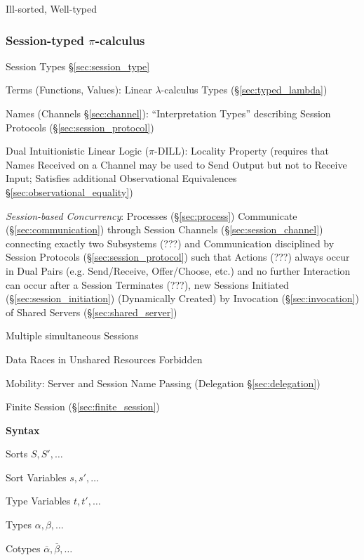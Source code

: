 Ill-sorted, Well-typed %



\subsubsection{Session-typed $\pi$-calculus}
\label{sec:session_typed_pi_calculus}
\cite{honda-vasconcelos-kubo98}
\cite{caires-pfenning10}

Session Types \S\ref{sec:session_type}

Terms (Functions, Values): Linear $\lambda$-calculus Types
(\S\ref{sec:typed_lambda})

Names (Channels \S\ref{sec:channel}): ``Interpretation Types''
describing Session Protocols (\S\ref{sec:session_protocol})

Dual Intuitionistic Linear Logic ($\pi$-DILL):
\cite{caires-pfenning10} Locality Property (requires that Names
Received on a Channel may be used to Send Output but not to Receive
Input; Satisfies additional Observational Equivalences
\S\ref{sec:observational_equality}) \cite{wadler12}

\emph{Session-based Concurrency}: Processes (\S\ref{sec:process})
Communicate (\S\ref{sec:communication}) through Session Channels
(\S\ref{sec:session_channel}) connecting exactly two Subsystems (???)
and Communication disciplined by Session Protocols
(\S\ref{sec:session_protocol}) such that Actions (???) always occur in
Dual Pairs (e.g. Send/Receive, Offer/Choose, etc.) and no further
Interaction can occur after a Session Terminates (???), new Sessions
Initiated (\S\ref{sec:session_initiation}) (Dynamically Created) by
Invocation (\S\ref{sec:invocation}) of Shared Servers
(\S\ref{sec:shared_server}) \cite{caires-pfenning10}

Multiple simultaneous Sessions

Data Races in Unshared Resources Forbidden

Mobility: Server and Session Name Passing (Delegation
\S\ref{sec:delegation})

Finite Session (\S\ref{sec:finite_session})


\textbf{Syntax}
\cite{honda-vasconcelos-kubo98}

Sorts $S, S', \ldots$

Sort Variables $s, s', \dots$

Type Variables $t, t', \ldots$

Types $\alpha, \beta, \ldots$

Cotypes $\overline{\alpha}, \overline{\beta}, \ldots$ %

